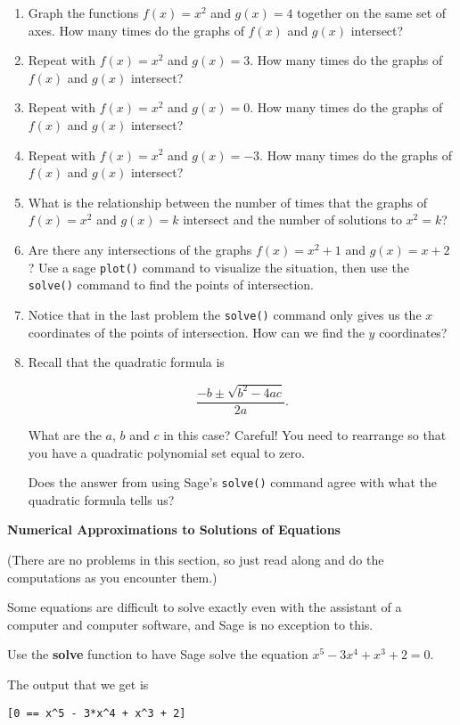 \begin{enumerate}
	\item Graph the functions $f(x)=x^2$ and $g(x)=4$ together
		on the same set of axes. How many times do the
		graphs of $f(x)$ and $g(x)$ intersect?
	\item Repeat with $f(x)=x^2$ and $g(x)=3$. How many times do the
		graphs of $f(x)$ and $g(x)$ intersect?
	\item Repeat with $f(x)=x^2$ and $g(x)=0$. How many times do the
		graphs of $f(x)$ and $g(x)$ intersect?
	\item Repeat with $f(x)=x^2$ and $g(x)=-3$. How many times do the
		graphs of $f(x)$ and $g(x)$ intersect?
	\item What is the relationship between the number of times
		that the graphs of $f(x)=x^2$ and $g(x)=k$ intersect and the
		number of solutions to $x^2=k$?
	\item Are there any intersections of the graphs $f(x) = x^2 + 1$ and $g(x) = x+2$ ? \newline
	Use a sage \verb+plot()+ command to visualize the situation, then use the \verb+solve()+ command to find the points of intersection. 
	\item Notice that in the last problem the \verb+solve()+ command only gives us the $x$ coordinates of the points of intersection.  How can we find the $y$ coordinates?
    \item Recall that the quadratic formula is 

    \[  \frac{-b \pm \sqrt{b^2 - 4ac}}{2a}. \]

    What are the $a$, $b$ and $c$ in this case?  Careful! You need to rearrange so that you have a quadratic polynomial set equal to zero.

    Does the answer from using Sage's \verb+solve()+ command agree with what the quadratic formula tells us?
\end{enumerate}

{\bf \Large Numerical Approximations to Solutions of Equations}

(There are no problems in this section, so just read along and do the computations as you encounter them.)

Some equations are difficult to solve exactly even with the
assistant of a computer and computer software, and Sage is no
exception to this. 

Use the \textbf{solve} function to have Sage solve the
equation $x^5-3x^4+x^3+2=0$. 

The output that we get is
\begin{verbatim}
[0 == x^5 - 3*x^4 + x^3 + 2]
\end{verbatim}

